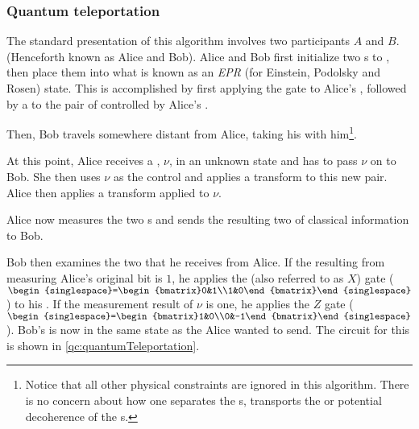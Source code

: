 \subsubsection{Quantum teleportation} %
\label{ssub:quantum_teleportation}

The standard presentation of this algorithm involves two participants $A$ and $B$. (Henceforth
known as Alice and Bob). Alice and Bob first initialize two \qubit{}s to , then place them
into what is known as an \emph{EPR} (for Einstein, Podolsky and Rosen) state. This is accomplished
by first applying the \Had{} gate to Alice's \qubit{}, followed by a \cnot{} to the pair of
\qubits{} controlled by Alice's \qubit{}.

Then, Bob travels somewhere distant from Alice, taking his \qubit{} with him\footnote{Notice that
all other physical constraints are ignored in this algorithm. There is no concern about how one
separates the \qubit{}s, transports the \qubit{} or potential decoherence of the \qubit{}s.}.

At this point, Alice receives a \qubit{}, $\nu$, in an unknown state and has to pass $\nu$ on to
Bob. She then uses $\nu$ as the control and applies a {\cnot{}} transform to this new pair. Alice
then applies a \Had{} transform applied to $\nu$.

Alice now measures the two \qubit{}s and sends the resulting two \bits{} of classical information
to Bob.

Bob then examines the two \bits{} that he receives from Alice. If the \bit{} resulting from
measuring Alice's original bit is $1$, he applies the \nottr{} (also referred to as $X$) gate
($\begin{singlespace}=\begin{bmatrix}0&1\\1&0\end{bmatrix}\end{singlespace}$) to his \qubit{}. If
the measurement result of $\nu$ is one, he applies the $Z$ gate
($\begin{singlespace}=\begin{bmatrix}1&0\\0&-1\end{bmatrix}\end{singlespace}$). Bob's \qubit{} is
now in the same state as the \qubit{} Alice wanted to send. The circuit for this is shown in
\vref{qc:quantumTeleportation}.

